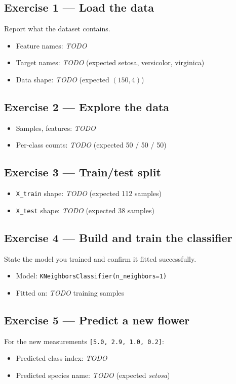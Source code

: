 \documentclass[11pt,a4paper]{article}
\begin{document}
\subsection{Exercise 1 — Load the data}
Report what the dataset contains.
\begin{itemize}[leftmargin=*]
  \item Feature names: \textit{TODO}
  \item Target names: \textit{TODO} \quad(expected setosa, versicolor, virginica)
  \item Data shape: \textit{TODO} \quad(expected $(150, 4)$)
\end{itemize}

\subsection{Exercise 2 — Explore the data}
\begin{itemize}[leftmargin=*]
  \item Samples, features: \textit{TODO}
  \item Per-class counts: \textit{TODO} \quad(expected 50 / 50 / 50)
\end{itemize}

\subsection{Exercise 3 — Train/test split}
\begin{itemize}[leftmargin=*]
  \item \lstinline|X_train| shape: \textit{TODO} \quad(expected 112 samples)
  \item \lstinline|X_test| shape: \textit{TODO} \quad(expected 38 samples)
\end{itemize}

\subsection{Exercise 4 — Build and train the classifier}
State the model you trained and confirm it fitted successfully.
\begin{itemize}[leftmargin=*]
  \item Model: \lstinline|KNeighborsClassifier(n_neighbors=1)|
  \item Fitted on: \textit{TODO} training samples
\end{itemize}

\subsection{Exercise 5 — Predict a new flower}
For the new measurements \lstinline|[5.0, 2.9, 1.0, 0.2]|:
\begin{itemize}[leftmargin=*]
  \item Predicted class index: \textit{TODO}
  \item Predicted species name: \textit{TODO} \quad(expected \emph{setosa})
\end{itemize}
\end{document}
